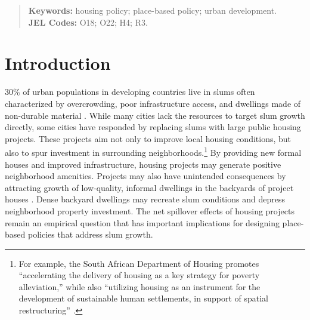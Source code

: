 \documentclass[12pt]{article}
\begin{document}
\begin{titlepage}
\begin{abstract}


\vspace{.1in}
\textbf{Keywords:} housing policy; place-based policy; urban development.\\
\textbf{JEL Codes:} O18; O22; H4; R3.  \\
\bigskip
\end{abstract}
\setcounter{page}{0}
\thispagestyle{empty}
\end{titlepage}

\section{Introduction} \label{sec:introduction}



30\% of urban populations in developing countries live in slums often characterized by overcrowding, poor infrastructure access, and dwellings made of non-durable material \citep{mdg}.  While many cities lack the resources to target slum growth directly, some cities have responded by replacing slums with large public housing projects.  These projects aim not only to improve local housing conditions, but also to spur investment in surrounding neighborhoods.\footnote{For example, the South African Department of Housing promotes ``accelerating the delivery of housing as a key strategy for poverty alleviation,'' while also ``utilizing housing as an instrument for the development of sustainable human settlements, in support of spatial restructuring'' \citep{bng}.}  By providing new formal houses and improved infrastructure, housing projects may generate positive neighborhood amenities.  Projects may also have unintended consequences by attracting growth of low-quality, informal dwellings in the backyards of project houses \citep{Brueckner2018backyarding}.  Dense backyard dwellings may recreate slum conditions and depress neighborhood property investment.  The net spillover effects of housing projects remain an empirical question that has important implications for designing place-based policies that address slum growth.
\end{document}

